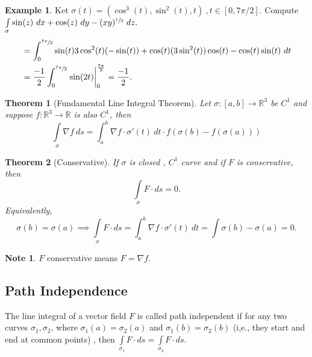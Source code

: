 \documentclass[
	12pt,
	]{article}
\newcommand{\R}{\mathbb{R}}
\theoremstyle{custom}
\newtheorem{theorem}{Theorem}[section]
\theoremstyle{custom}
\theoremstyle{custom}
\theoremstyle{custom}
\theoremstyle{custom}
\theoremstyle{definition}
\newtheorem{example}{Example}[section]
\theoremstyle{example}
\newtheorem*{note}{Note}
\theoremstyle{note}
\theoremstyle{remark}
\theoremstyle{example}
\newcounter{theo}[section]\setcounter{theo}{0}
\numberwithin{equation}{subsection}
\begin{document}
  				\begin{example}
  					Ket $\sigma(t) = (\cos^{3}(t) , \sin^{2}(t), t)  \ , t\in [0 , 7\pi/ 2]$. Compute $\int\limits_{\sigma} \sin(z) \ dx + \cos(z) \ dy - (xy)^{\sfrac{1}{3}} \ dz.$
  					\begin{align*}
  						&= \int_{0}^{\sfrac{7\pi}{2}} \sin(t) 3\cos^{2}(t)(-\sin(t)) + \cos(t)(3\sin^{2}(t))\cos(t) - \cos(t)\sin(t) \ dt\\
  						&= \frac{-1}{2} \int_{0}^{\sfrac{7\pi}{2}} \eval{\sin(2t)}_{0}^{\frac{7\pi}{2}} = \frac{-1}{2}.
  					\end{align*}
  				\end{example}
  				
  				\begin{theorem}[Fundamental Line Integral Theorem]
  					Let $\sigma : [a,b] \to \R^{3}$ be $C^{1}$ and suppose $f: \R^{3} \to \R$ is also $C^{1}$, then 
  					\begin{equation}
  						\int\limits_{\sigma} \nabla f \ ds = \int_{a}^{b} \nabla f \cdot \sigma'(t) \ dt \cdot f(\sigma (b) - f(\sigma(a)))
  					\end{equation}
  				\end{theorem}
  				
  				\begin{theorem}[Conservative]
  					If $\sigma$ is closed , $C^{1}$ curve and if $F$ is conservative, then 
  					\begin{equation} 
  					\int\limits_{\sigma} F \cdot ds = 0.
  					\end{equation}
  					Equivalently, 
  					\begin{equation} 
  					\sigma(b) = \sigma(a) \implies \int\limits_{\sigma}F\cdot ds = \int_{a}^{b} \nabla f \cdot \sigma'(t)\ dt = \int \sigma(b) - \sigma(a) = 0.
  					\end{equation}
  				\end{theorem}
  				
  				\begin{note}
	  				$F$ conservative means $F=\nabla f$.
  				\end{note}
  				
  			\subsection{Path Independence}
  				The line integral of a vector field $F$ is called path independent if for any two curves $\sigma_{1} , \sigma_{2}$, where $\sigma_{1}(a) = \sigma_{2}(a)$ and $\sigma_{1}(b) = \sigma_{2}(b)$ (i,e., they start and end at common points) , then $\int\limits_{\sigma_{1}}F\cdot ds = \int\limits_{\sigma_{2}}F\cdot ds$.
  				
\end{document}
